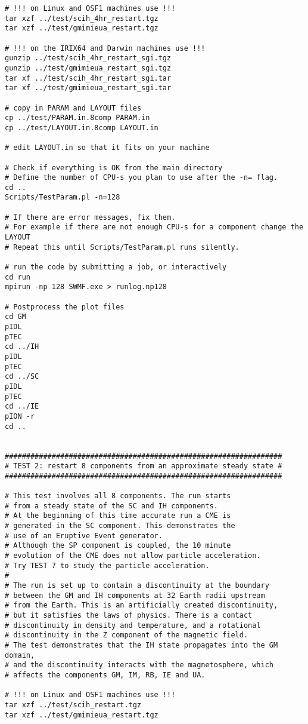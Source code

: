 \begin{verbatim}
# !!! on Linux and OSF1 machines use !!!
tar xzf ../test/scih_4hr_restart.tgz
tar xzf ../test/gmimieua_restart.tgz

# !!! on the IRIX64 and Darwin machines use !!!
gunzip ../test/scih_4hr_restart_sgi.tgz
gunzip ../test/gmimieua_restart_sgi.tgz
tar xf ../test/scih_4hr_restart_sgi.tar
tar xf ../test/gmimieua_restart_sgi.tar

# copy in PARAM and LAYOUT files
cp ../test/PARAM.in.8comp PARAM.in
cp ../test/LAYOUT.in.8comp LAYOUT.in

# edit LAYOUT.in so that it fits on your machine

# Check if everything is OK from the main directory
# Define the number of CPU-s you plan to use after the -n= flag.
cd ..
Scripts/TestParam.pl -n=128

# If there are error messages, fix them. 
# For example if there are not enough CPU-s for a component change the LAYOUT
# Repeat this until Scripts/TestParam.pl runs silently.

# run the code by submitting a job, or interactively
cd run
mpirun -np 128 SWMF.exe > runlog.np128

# Postprocess the plot files
cd GM
pIDL
pTEC
cd ../IH
pIDL
pTEC
cd ../SC
pIDL
pTEC
cd ../IE
pION -r
cd ..


#################################################################
# TEST 2: restart 8 components from an approximate steady state #
#################################################################

# This test involves all 8 components. The run starts 
# from a steady state of the SC and IH components.
# At the beginning of this time accurate run a CME is 
# generated in the SC component. This demonstrates the
# use of an Eruptive Event generator.
# Although the SP component is coupled, the 10 minute 
# evolution of the CME does not allow particle acceleration.
# Try TEST 7 to study the particle acceleration.
#
# The run is set up to contain a discontinuity at the boundary
# between the GM and IH components at 32 Earth radii upstream
# from the Earth. This is an artificially created discontinuity, 
# but it satisfies the laws of physics. There is a contact
# discontinuity in density and temperature, and a rotational
# discontinuity in the Z component of the magnetic field.
# The test demonstrates that the IH state propagates into the GM domain,
# and the discontinuity interacts with the magnetosphere, which
# affects the components GM, IM, RB, IE and UA.

# !!! on Linux and OSF1 machines use !!!
tar xzf ../test/scih_restart.tgz
tar xzf ../test/gmimieua_restart.tgz


\end{verbatim}
